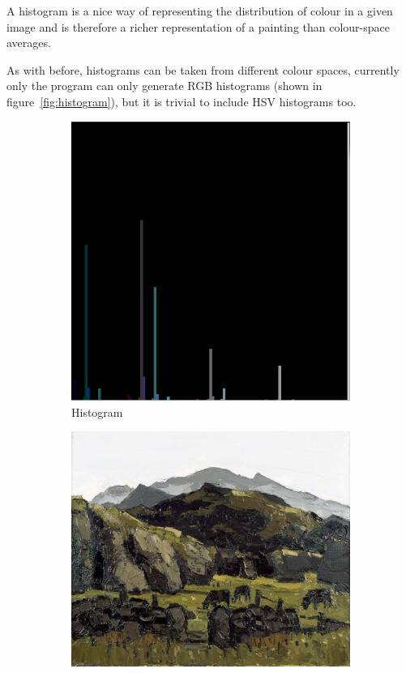 \documentclass[11pt,fleqn,twoside]{article}
\begin{document}
A histogram is a nice way of representing the distribution of colour in a given image and is 
therefore a richer representation of a painting than colour-space averages.

As with before, histograms can be taken from different colour spaces, currently only the program
can only generate RGB histograms (shown in figure~\ref{fig:histogram}), but it is trivial to 
include HSV histograms too.

\begin{figure}[h]
\centering
\begin{subfigure}[b]{0.4\textwidth}
  \includegraphics[width=\textwidth]{img/histogram.png}
  \caption{Histogram}
\end{subfigure}
\begin{subfigure}[b]{0.4\textwidth}
  \includegraphics[width=\textwidth]{img/nlw_nlw_kwf00078_large.jpg}

\end{subfigure}
\end{figure}
\end{document}
